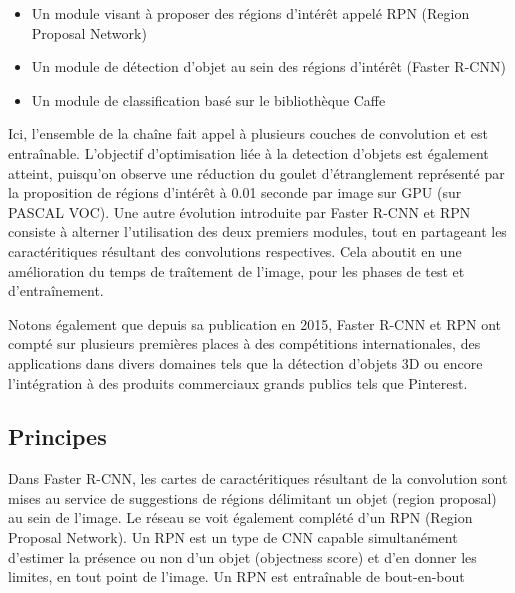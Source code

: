       \begin{itemize}
       \item Un module visant à proposer des régions d'intérêt appelé RPN (Region Proposal Network)
       \item Un module de détection d'objet au sein des régions d'intérêt (Faster R-CNN) 
       \item Un module de classification basé sur le bibliothèque Caffe
      \end{itemize}
      
      Ici, l'ensemble de la chaîne fait appel à plusieurs couches de convolution et est entraînable. 
      L'objectif d'optimisation liée à la detection d'objets est également atteint, 
      puisqu'on observe une réduction du goulet d'étranglement représenté par la proposition de régions d'intérêt à 0.01 seconde par image sur GPU (sur PASCAL VOC). 
      Une autre évolution introduite par Faster R-CNN et RPN consiste à alterner l'utilisation des deux premiers modules, tout en partageant les caractéritiques résultant des convolutions respectives. 
      Cela aboutit en une amélioration du temps de traîtement de l'image, pour les phases de test et d'entraînement. 
      
      Notons également que depuis sa publication en 2015, Faster R-CNN et RPN ont compté sur plusieurs premières places à des compétitions internationales, des applications dans divers domaines tels que la détection
      d'objets 3D ou encore l'intégration à des produits commerciaux grands publics tels que Pinterest. 
      
    \subsection{Principes}
      
      Dans Faster R-CNN, les cartes de caractéritiques résultant de la convolution sont mises au service de suggestions de régions délimitant un objet (region proposal) au sein de l'image. Le réseau se voit également
      complété d'un RPN (Region Proposal Network). Un RPN est un type de CNN capable simultanément d'estimer la présence ou non d'un objet (objectness score) et d'en donner les limites, en tout point de l'image.
      Un RPN est entraînable de bout-en-bout 
      
      